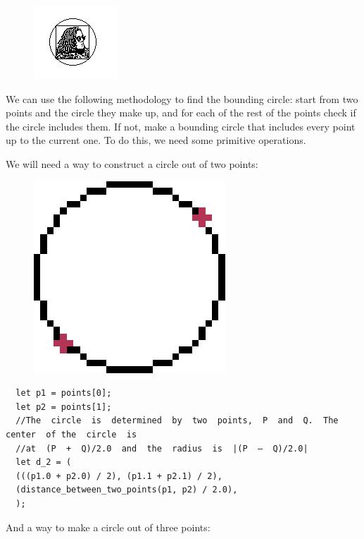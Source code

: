 \documentclass[12pt,a4,oneside,usenames,dvipsnames]{book}
\begin{document}
\begin{figure}[H]
\centering
\includegraphics{figures/minidisc.png}
\end{figure}

We can use the following methodology to find the bounding circle: start from two points and the circle they make up, and for each of the rest of the points check if the circle includes them. If not, make a bounding circle that includes every point up to the current one. To do this, we need some primitive operations.

We will need a way to construct a circle out of two points:

\begin{figure}[H]
\centering
  \includegraphics[scale=0.25,keepaspectratio]{figures/two_points_circle.png}
\end{figure}

\begin{verbatim}
  let p1 = points[0];
  let p2 = points[1];
  //The  circle  is  determined  by  two  points,  P  and  Q.  The  center  of the  circle  is
  //at  (P  +  Q)/2.0  and  the  radius  is  |(P  –  Q)/2.0|
  let d_2 = (
  (((p1.0 + p2.0) / 2), (p1.1 + p2.1) / 2),
  (distance_between_two_points(p1, p2) / 2.0),
  );
\end{verbatim}

And a way to make a circle out of three points:
\end{document}

